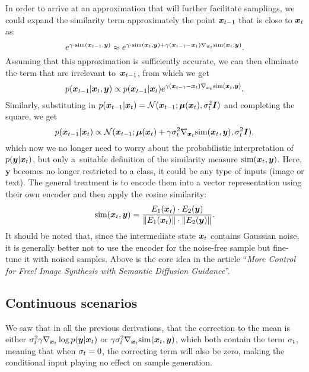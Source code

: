 In order to arrive at an approximation that will further facilitate samplings, we could expand the similarity term approximately the point $\bm{x}_{t-1}$ that is close to $\bm{x}_{t}$ as:
\begin{equation}
    \label{eq:9.12}
    e^{\gamma\cdot\mbox{\scriptsize{sim}}(\bm{x}_{t-1},\bm{y})}\approx e^{\gamma\cdot\mbox{\scriptsize{sim}}(\bm{x}_{t},\bm{y}) + \gamma(\bm{x}_{t-1}-\bm{x}_{t})\nabla_{\bm{x}_{t}} \mbox{\scriptsize{sim}}(\bm{x}_{t},\bm{y})}.
\end{equation}
Assuming that this approximation is sufficiently accurate, we can then eliminate the term that are irrelevant to $\bm{x}_{t-1}$, from which we get
\begin{equation}
    \label{eq:9.13}
    p(\bm{x}_{t-1}|\bm{x}_{t},\bm{y})\propto p(\bm{x}_{t-1}|\bm{x}_{t})e^{ \gamma(\bm{x}_{t-1}-\bm{x}_{t})\nabla_{\bm{x}_{t}} \mbox{\scriptsize{sim}}(\bm{x}_{t},\bm{y})}.
\end{equation}
Similarly, substituting in $p(\bm{x}_{t-1}|\bm{x}_{t})=\mathcal{N}(\bm{x}_{t-1};\bm{\mu}(\bm{x}_{t}),\sigma_t^2\bm{I})$ and completing the square, we get
\begin{equation}
    \label{eq:9.14}
    p(\bm{x}_{t-1}|\bm{x}_{t})\propto\mathcal{N}(\bm{x}_{t-1};\bm{\mu}(\bm{x}_{t})+\gamma\sigma_t^2\nabla_{\bm{x}_{t}}\mbox{sim}(\bm{x}_{t},\bm{y}),\sigma_t^2\bm{I}),
\end{equation}
which now we no longer need to worry about the probabilistic interpretation of $p(\bm{y}|\bm{x}_{t})$, but only a suitable definition of the similarity measure $\mbox{sim}(\bm{x}_{t},\bm{y})$. Here, $\bm{y}$ becomes no longer restricted to a class, it could be any type of inputs (image or text). The general treatment is to encode them into a vector representation using their own encoder and then apply the cosine similarity:
\begin{equation}
    \label{eq:9.15}
    \mbox{sim}(\bm{x}_{t},\bm{y})=\frac{E_{1}(\bm{x}_{t})\cdot E_{2}(\bm{y})}{\|E_{1}(\bm{x}_{t})\|\cdot\|E_{2}(\bm{y})\|}.
\end{equation}
It should be noted that, since the intermediate state $\bm{x}_{t}$ contains Gaussian noise, it is generally better not to use the encoder for the noise-free sample but fine-tune it with noised samples. Above is the core idea in the article ``\emph{More Control for Free! Image Synthesis with Semantic Diffusion Guidance}''.

\subsection{Continuous scenarios}
We saw that in all the previous derivations, that the correction to the mean is either $\sigma_t^2\gamma\nabla_{\bm{x}_{t}}\log p(\bm{y}|\bm{x}_{t})$ or $\gamma\sigma_t^2\nabla_{\bm{x}_{t}}\mbox{sim}(\bm{x}_{t},\bm{y})$, which both contain the term $\sigma_t$, meaning that when $\sigma_t=0$, the correcting term will also be zero, making the conditional input playing no effect on sample generation.

